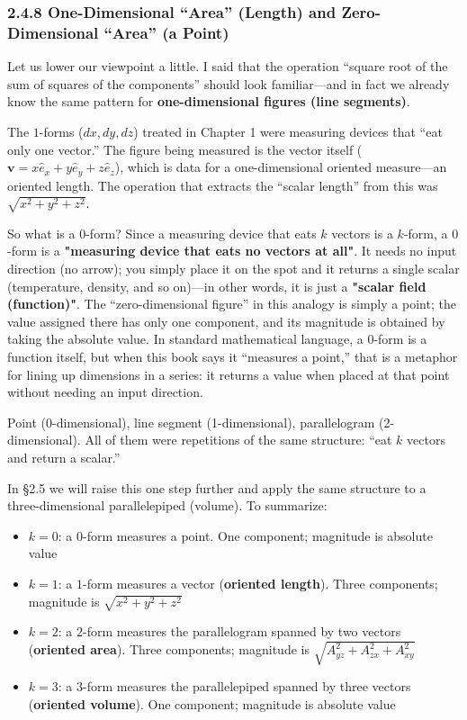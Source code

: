 \documentclass[a4paper,12pt,openany]{book}
\begin{document}
\hypertarget{one-dimensional-area-length-and-zero-dimensional-area-a-point}{%
\subsubsection{2.4.8 One-Dimensional ``Area'' (Length) and
Zero-Dimensional ``Area'' (a
Point)}\label{one-dimensional-area-length-and-zero-dimensional-area-a-point}}

Let us lower our viewpoint a little. I said that the operation ``square
root of the sum of squares of the components'' should look
familiar—and in fact we already know the same pattern for
\textbf{one-dimensional figures (line segments)}.

The \(1\)-forms (\(dx, dy, dz\)) treated in Chapter 1 were measuring
devices that ``eat only one vector.'' The figure being measured is the
vector itself (\(\mathbf{v} = x\hat{e}_x + y\hat{e}_y + z\hat{e}_z\)),
which is data for a one-dimensional oriented measure—an oriented
length. The operation that extracts the ``scalar length'' from this was
\(\sqrt{x^2+y^2+z^2}\).

So what is a \(0\)-form? Since a measuring device that eats \(k\)
vectors is a \(k\)-form, a \(0\)-form is a
\textbf{"measuring device that eats no vectors at all"}. It needs no
input direction (no arrow); you simply place it on the spot and it
returns a single scalar (temperature, density, and so on)—in other
words, it is just a \textbf{"scalar field (function)"}. The
``zero-dimensional figure'' in this analogy is simply a point; the value
assigned there has only one component, and its magnitude is obtained by
taking the absolute value. In standard mathematical language, a
\(0\)-form is a function itself, but when this book says it ``measures a
point,'' that is a metaphor for lining up dimensions in a series: it
returns a value when placed at that point without needing an input
direction.

Point (0-dimensional), line segment (1-dimensional), parallelogram
(2-dimensional). All of them were repetitions of the same structure:
``eat \(k\) vectors and return a scalar.''

In §2.5 we will raise this one step further and apply the same structure
to a three-dimensional parallelepiped (volume). To summarize:

\begin{itemize}
\item
  \(k=0\): a \(0\)-form measures a point. One component; magnitude is
  absolute value
\item
  \(k=1\): a \(1\)-form measures a vector (\textbf{oriented length}).
  Three components; magnitude is \(\sqrt{x^2+y^2+z^2}\)
\item
  \(k=2\): a \(2\)-form measures the parallelogram spanned by two
  vectors (\textbf{oriented area}). Three components; magnitude is
  \(\sqrt{A_{yz}^2+A_{zx}^2+A_{xy}^2}\)
\item
  \(k=3\): a \(3\)-form measures the parallelepiped spanned by three
  vectors (\textbf{oriented volume}). One component; magnitude is
  absolute value
\end{itemize}
\end{document}
